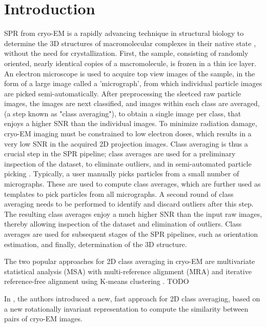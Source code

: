 \documentclass{article}
\begin{document}
\section{Introduction}
\label{sec:intro}
SPR from cryo-EM is a rapidly advancing technique in structural biology to determine
the 3D structures of macromolecular complexes in their native state \cite{Frank1, Kuhlbrandt1443},
 without the need for crystallization. First, the sample, consisting of randomly oriented, nearly identical copies of a macromolecule, is frozen in a thin ice layer. An electron microscope is used to acquire top view images of the sample, in the form of a large image called a 'micrograph', from which individual particle images are picked semi-automatically. After preprocessing the sleetced raw particle images, the images are next classified, and images within each class are averaged, (a step known as "class averaging"), to obtain a single image per class, that enjoys a higher SNR than the individual images. To minimize radiation damage, cryo-EM imaging must be constrained to low electron doses, which results in a very low SNR in the acquired 2D projection images. Class averaging is thus a crucial step in the SPR pipeline; class averages are used for a preliminary inspection of the dataset, to eliminate outliers, and in semi-automated particle picking \cite{relion}. Typically, a user manually picks particles from a small number of micrographs. These are used to compute class averages, which are further used as templates to pick particles from all micrographs. A second round of class averaging needs to be performed to identify and discard outliers after this step. The resulting class averages enjoy a much higher SNR than the input raw images, thereby allowing inspection of the dataset and elimination of outliers. Class averages are used for subsequent stages of the SPR pipelines, such as orientation estimation, and finally, determination of the 3D structure.
 
The two popular approaches for 2D class averaging \cite{Penczek1992,Penczek1996, vanHeel1990a, vanHeel1981} in cryo-EM are multivariate statistical analysis (MSA)\cite{vanHeel1981} with multi-reference alignment (MRA) \cite{Dube1993} and iterative reference-free alignment using K-means clustering \cite{Penczek1996}. {\color{red} TODO}

In \cite{zhao}, the authors introduced a new, fast approach for 2D class averaging, based on a new rotationally invariant representation to compute the similarity between pairs of cryo-EM images.
\end{document}
